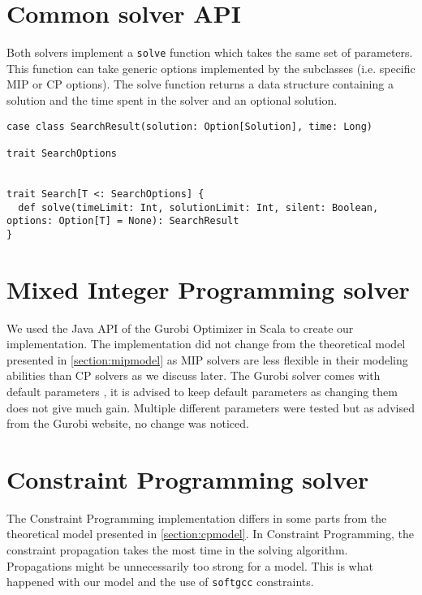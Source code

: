 \documentclass[../thesis.tex]{subfiles}
\begin{document}
\section{Common solver API}

Both solvers implement a \texttt{solve} function which takes the same set of parameters.
This function can take generic options implemented by the subclasses (i.e. specific MIP or CP options).
The solve function returns a data structure containing a solution and the time spent in the solver and an optional solution.

\begin{lstlisting}[style=scalaStyle,caption={Solver API},captionpos=b]
case class SearchResult(solution: Option[Solution], time: Long)

trait SearchOptions


trait Search[T <: SearchOptions] {
  def solve(timeLimit: Int, solutionLimit: Int, silent: Boolean, options: Option[T] = None): SearchResult
}
\end{lstlisting}

\section{Mixed Integer Programming solver}

We used the Java API \cite{gurobi:java} of the Gurobi Optimizer in Scala to create our implementation. 
The implementation did not change from the theoretical model presented in \autoref{section:mipmodel} as 
MIP solvers are less flexible in their modeling abilities than CP solvers as we discuss later. The Gurobi solver 
comes with default parameters \cite{gurobi:parameters}, it is advised to keep default parameters as 
changing them does not give much gain. Multiple different parameters were tested but as advised from the Gurobi website, 
no change was noticed.

\section{Constraint Programming solver}

The Constraint Programming implementation differs in some parts from the theoretical model 
presented in \autoref{section:cpmodel}. In Constraint Programming, the constraint propagation 
takes the most time in the solving algorithm. Propagations might be unnecessarily too strong for a model.
This is what happened with our model and the use of \texttt{softgcc} constraints. 
\end{document}
